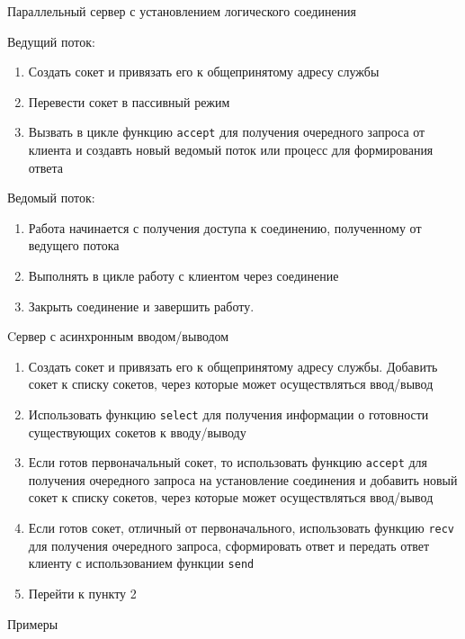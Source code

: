 \begin{frame}{Параллельный сервер с установлением логического соединения}

Ведущий поток:
	\begin{enumerate}
		\item Создать сокет и привязать его к общепринятому адресу службы
		\item Перевести сокет в пассивный режим
		\item Вызвать в цикле функцию {\tt accept} для получения очередного запроса от клиента и создавть новый ведомый поток или процесс для формирования ответа
	\end{enumerate}
\pause
Ведомый поток:
	\begin{enumerate}
		\item Работа начинается с получения доступа к соединению,  полученному от ведущего потока
		\item Выполнять в цикле работу с клиентом через соединение
		\item Закрыть соединение и завершить работу.
	\end{enumerate}
\end{frame}

\begin{frame}{Cервер с асинхронным вводом/выводом}

	\begin{enumerate}
		\item Создать сокет и привязать его к общепринятому адресу службы. Добавить сокет к списку сокетов,  через которые может осуществляться ввод/вывод
		\item Использовать функцию {\tt select} для получения информации о готовности существующих сокетов к вводу/выводу
		\item Если готов первоначальный сокет, то использовать функцию {\tt accept} для получения очередного запроса на установление соединения и добавить новый сокет к списку сокетов,  через которые может осуществляться ввод/вывод
		\item Если готов сокет,  отличный от первоначального,  использовать функцию {\tt recv} для получения очередного запроса,  сформировать ответ и передать ответ клиенту с использованием функции {\tt send}
		\item Перейти к пункту 2
	\end{enumerate}
\end{frame}

\begin{frame}{}
	\Huge
	\begin{center}
		Примеры
	\end{center}
\end{frame}

